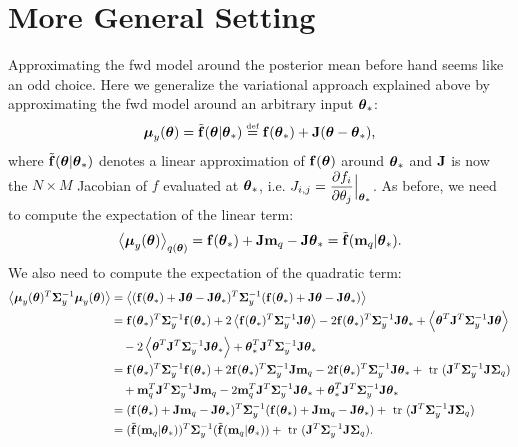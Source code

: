 \section{More General Setting}
Approximating the fwd model around the  posterior mean before hand seems like an odd choice. Here we generalize the 
variational approach explained above by approximating the fwd model around an arbitrary input $\thetastar$:
\begin{align}
	\muy(\vectheta) = \ftilde(\vectheta | \thetastar) \defeq  \vecf(\thetastar) + \J (\vectheta - \thetastar) \text{,}
\end{align}
where $\ftilde(\vectheta | \thetastar)$ denotes a linear approximation of $\vecf(\vectheta)$ around $\thetastar$ and
$\J$ is now the $N \times M$ Jacobian of $f$ evaluated at $\thetastar$,
i.e. $
\displaystyle
J_{i,j} = \deriv{f_{i}}{\theta_{j}} \Big|_{\thetastar}
$.
%
%
As before, we need to compute the expectation of the linear term:
\begin{align}
\Eb{\muy(\vectheta)}_{q(\vectheta)} = \vecf(\thetastar) + \J \mq - \J \thetastar  = \ftilde(\mq | \thetastar) \text{.}
\end{align}
%
We also need to compute the expectation of the quadratic term:
\begin{align}
\nonumber
	 \Eb{\muy(\vectheta)^{T} \Sigmay^{-1}\muy(\vectheta)} & = 
	\Eb{ (\vecf(\thetastar) + \J \vectheta - \J \thetastar  )^{T} \Sigmay^{-1}  (\vecf(\thetastar) + \J \vectheta - \J \thetastar  )} \\
	 & =  \vecf(\thetastar)^{T} \Sigmay^{-1}\vecf(\thetastar) + 2 \Eb{\vecf(\thetastar)^{T} \Sigmay^{-1} \J \vectheta} 
\nonumber
	 - 2 \fthetastar^{T}\Sigmay^{-1}\J\thetastar + \Eb{\vectheta^{T} \J^{T} \Sigmay^{-1} \J \vectheta} \\
 \nonumber
	&  \quad - 2 \Eb{\vectheta^{T} \J^{T} \Sigmay^{-1} \J \thetastar} + \thetastar^{T} \J^{T} \Sigmay^{-1} \J \thetastar \\
	&= \fthetastar^{T} \Sigmay^{-1}\fthetastar + 2\fthetastar^{T} \Sigmay^{-1} \J \mq
\nonumber	
	- 2 \fthetastar^{T} \Sigmay^{-1} \J \thetastar + \trace (\J^{T} \Sigmay^{-1} \J \Sigmaq) \\
	& \quad + \mq^{T} \J^{T} \Sigmay^{-1} \J \mq 
	\nonumber
	-2 \mq^{T} \J^{T} \Sigmay^{-1} \J \thetastar + \thetastar^{T} \J^{T} \Sigmay^{-1} \J \thetastar \\
	\nonumber
	& =   (\fthetastar + \J \mq - \J \thetastar)^{T} \Sigmay^{-1} (\fthetastar + \J \mq - \J \thetastar)  + \trace (\J^{T} \Sigmay^{-1} \J \Sigmaq) \\
	&= (\ftilde(\mq | \thetastar))^{T} \Sigmay^{-1} (\ftilde(\mq | \thetastar)) + \trace (\J^{T} \Sigmay^{-1} \J \Sigmaq) \text{.}
\end{align}
